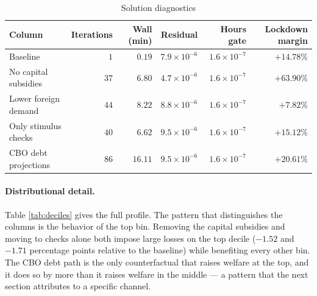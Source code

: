 \begin{table}[t]\centering
\caption{Solution diagnostics}\label{tab:diag}
\small
\begin{tabular}{lrrrrr}
\toprule
Column & Iterations & Wall (min) & Residual & Hours gate & Lockdown margin \\
\midrule
Baseline              & $1$  & $0.19$  & $7.9\times10^{-6}$ & $1.6\times10^{-7}$ & $+14.78\%$ \\
No capital subsidies  & $37$ & $6.80$  & $4.7\times10^{-6}$ & $1.6\times10^{-7}$ & $+63.90\%$ \\
Lower foreign demand  & $44$ & $8.22$  & $8.8\times10^{-6}$ & $1.6\times10^{-7}$ & $+7.82\%$ \\
Only stimulus checks  & $40$ & $6.62$  & $9.5\times10^{-6}$ & $1.6\times10^{-7}$ & $+15.12\%$ \\
CBO debt projections  & $86$ & $16.11$ & $9.5\times10^{-6}$ & $1.6\times10^{-7}$ & $+20.61\%$ \\
\bottomrule
\end{tabular}
\end{table}

\paragraph{Distributional detail.} Table \ref{tab:deciles} gives the full
profile. The pattern that distinguishes the columns is the behavior of the top
bin. Removing the capital subsidies and moving to checks alone both impose large
losses on the top decile ($-1.52$ and $-1.71$ percentage points relative to the
baseline) while benefiting every other bin. The CBO debt path is the only
counterfactual that raises welfare at the top, and it does so by more than it
raises welfare in the middle --- a pattern that the next section attributes to a
specific channel.

